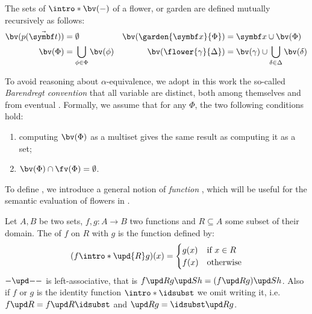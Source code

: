 \begin{scope}
\begin{definition}[Bound variables]
  The sets of  $\intro*\bv(-)$ of a flower, 
  or garden are defined mutually recursively as follows:
  \begin{align*}
    \bv(p(\tvec{t})) &= \emptyset &
    \bv(\garden{\bx}{\Phi}) &= \bx \cup \bv(\Phi) \\
    \bv(\Phi) &= \bigcup_{\phi \in \Phi}{\bv(\phi)} &
    \bv(\flower{\gamma}{\Delta}) &= \bv(\gamma) \cup \bigcup_{\delta \in \Delta}{\bv(\delta)}
  \end{align*}
\end{definition}

To avoid reasoning about $\alpha$-equivalence, we adopt in this work the
so-called \emph{Barendregt convention} that all variable  are distinct,
both among themselves and from eventual . Formally, we assume that
for any  $\Phi$, the two following conditions hold:
\begin{enumerate}
  \item computing $\bv(\Phi)$ as a multiset gives the same result as computing
  it as a set;
  \item $\bv(\Phi) \cap \fv(\Phi) = \emptyset$.
\end{enumerate} 

To define , we introduce a general notion of \emph{function
}, which will be useful for the semantic evaluation of flowers in
.

\begin{definition}
  Let $A, B$ be two sets, $f, g : A \to B$ two functions and $R \subseteq A$
  some subset of their domain. The  of $f$ on $R$ with $g$ is the
  function defined by:
  $$
  (f \intro*\upd{R} g)(x) =
  \begin{cases}
    g(x) &\text{if $x \in R$} \\
    f(x) &\text{otherwise}
  \end{cases}
  $$
  $\update{-}{-}{-}$ is left-associative, that is
  $\update{f}{R}{\update{g}{S}{h}} = \update{(\update{f}{R}{g})}{S}{h}$. Also if
  $f$ or $g$ is the identity function $\intro*\idsubst$ we omit writing it, i.e.
  $\update{f}{R}{{}} = \update{f}{R}{\idsubst}$ and $\update{{}}{R}{g} =
  \update{\idsubst}{R}{g}$.
\end{definition}


\end{scope}
